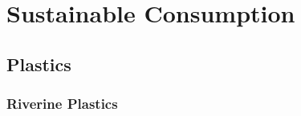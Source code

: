 \chapter{Sustainable Consumption}\label{ch:consumption}

\section{Plastics}

\subsection{Riverine Plastics}


